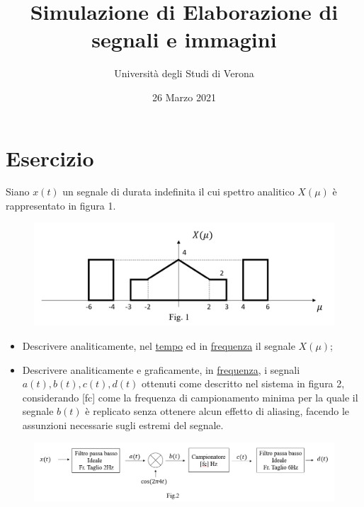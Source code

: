 \documentclass[a4paper]{article}
\begin{document}
	\author{Università degli Studi di Verona}
	\title{Simulazione di Elaborazione di segnali e immagini}
	\date{{\Large 26 Marzo 2021}}
	\maketitle
	
	\section{Esercizio}
	
	Siano $x\left(t\right)$ un segnale di durata indefinita il cui spettro analitico $X\left(\mu\right)$ è rappresentato in figura 1.
	\begin{figure}[!htp]
		\centering
		\includegraphics[width=\textwidth]{img/fig_1.png}
	\end{figure}

	\begin{itemize}
		\item Descrivere analiticamente, nel \underline{tempo} ed in \underline{frequenza} il segnale $X\left(\mu\right)$;
		
		\item Descrivere analiticamente e graficamente, in \underline{frequenza}, i segnali $a\left(t\right), b\left(t\right), c\left(t\right), d\left(t\right)$ ottenuti come descritto nel sistema in figura 2, considerando [fc] come la frequenza di campionamento minima per la quale il segnale $b\left(t\right)$ è replicato senza ottenere alcun effetto di aliasing, facendo le assunzioni necessarie sugli estremi del segnale.
	\end{itemize}
	\begin{figure}[!htp]
		\centering
		\includegraphics[width=\textwidth]{img/fig_2.png}
	\end{figure}\newpage
\end{document}
